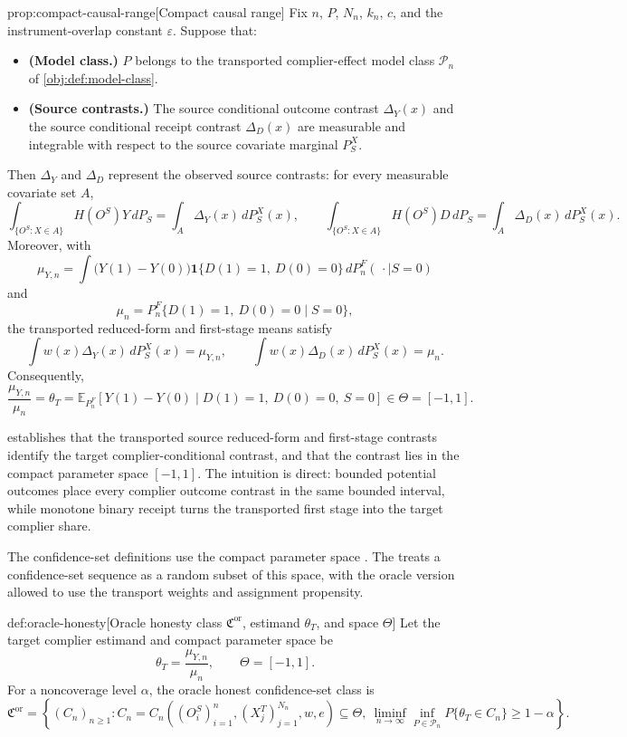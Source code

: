 \begin{theoremv}{prop:compact-causal-range}[Compact causal range]
Fix \(n\), \(P\), \(N_n\), \(k_n\), \(c\), and the instrument-overlap constant \(\varepsilon\). Suppose that:
\begin{itemize}
\item \textbf{(Model class.)} \(P\) belongs to the transported complier-effect model class \(\mathcal P_n\) of \cref{obj:def:model-class}.
\item \textbf{(Source contrasts.)} The source conditional outcome contrast \(\Delta_Y(x)\) and the source conditional receipt contrast \(\Delta_D(x)\) are measurable and integrable with respect to the source covariate marginal \(P_S^X\).
\end{itemize}
Then \(\Delta_Y\) and \(\Delta_D\) represent the observed source contrasts: for every measurable covariate set \(A\),
\[
\int_{\{O^S:X\in A\}} H(O^S)Y\,dP_S
=
\int_A \Delta_Y(x)\,dP_S^X(x),
\qquad
\int_{\{O^S:X\in A\}} H(O^S)D\,dP_S
=
\int_A \Delta_D(x)\,dP_S^X(x).
\]
Moreover, with
\[
\mu_{Y,n}
=
\int \bigl(Y(1)-Y(0)\bigr)\mathbf 1\{D(1)=1,\ D(0)=0\}\,dP_n^F(\,\cdot\mid S=0)
\]
and
\[
\mu_n
=
P_n^F\{D(1)=1,\ D(0)=0\mid S=0\},
\]
the transported reduced-form and first-stage means satisfy
\[
\int w(x)\Delta_Y(x)\,dP_S^X(x)=\mu_{Y,n},
\qquad
\int w(x)\Delta_D(x)\,dP_S^X(x)=\mu_n.
\]
Consequently,
\[
\frac{\mu_{Y,n}}{\mu_n}
=
\theta_T
=
\mathbb E_{P_n^F}\!\left[Y(1)-Y(0)\mid D(1)=1,\ D(0)=0,\ S=0\right]
\in \Theta=[-1,1].
\]
\end{theoremv}

 establishes that the transported source reduced-form and first-stage contrasts identify the target complier-conditional contrast, and that the contrast lies in the compact parameter space \([-1,1]\). The intuition is direct: bounded potential outcomes place every complier outcome contrast in the same bounded interval, while monotone binary receipt turns the transported first stage into the target complier share.

The confidence-set definitions use the compact parameter space . The  treats a confidence-set sequence as a random subset of this space, with the oracle version allowed to use the transport weights and assignment propensity.

\begin{definitionv}{def:oracle-honesty}[Oracle honesty class $\mathfrak C^{\mathrm{or}}$, estimand $\theta_T$, and space $\Theta$]
Let the target complier estimand and compact parameter space be
\[
\theta_T=\frac{\mu_{Y,n}}{\mu_n},
\qquad
\Theta=[-1,1].
\]
For a noncoverage level \(\alpha\), the oracle honest confidence-set class is
\[
\mathfrak C^{\mathrm{or}}
=
\left\{
(C_n)_{n\ge 1} :
C_n
=
C_n\!\left((O_i^S)_{i=1}^n,(X_j^T)_{j=1}^{N_n},w,e\right)
\subseteq \Theta,\ 
\liminf_{n\to\infty}\inf_{P\in\mathcal P_n}
P\{\theta_T\in C_n\}
\ge 1-\alpha
\right\}.
\]
\end{definitionv}

